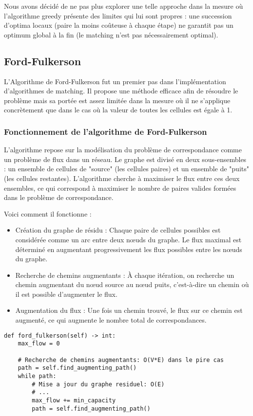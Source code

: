\documentclass[11pt, a4paper]{article}
\begin{document}
Nous avons décidé de ne pas plus explorer une telle approche dans la mesure où l'algorithme greedy présente des limites qui lui sont propres : une succession d'optima locaux (paire la moins coûteuse à chaque étape) ne garantit pas un optimum global à la fin (le matching n'est pas nécessairement optimal).

\subsection{Ford-Fulkerson}

L'Algorithme de Ford-Fulkerson fut un premier pas dans l'implémentation d'algorithmes de matching. Il propose une méthode efficace afin de résoudre le problème mais sa portée est assez limitée dans la mesure où il ne s'applique concrètement que dans le cas où la valeur de toutes les cellules est égale à 1.

\subsubsection{Fonctionnement de l'algorithme de Ford-Fulkerson}

L'algorithme repose sur la modélisation du problème de correspondance comme un problème de flux dans un réseau. Le graphe est divisé en deux sous-ensembles : un ensemble de cellules de "source" (les cellules paires) et un ensemble de "puits" (les cellules restantes). L'algorithme cherche à maximiser le flux entre ces deux ensembles, ce qui correspond à maximiser le nombre de paires valides formées dans le problème de correspondance.

Voici comment il fonctionne :

\begin{itemize}
    \item Création du graphe de résidu : Chaque paire de cellules possibles est considérée comme un arc entre deux nœuds du graphe. Le flux maximal est déterminé en augmentant progressivement les flux possibles entre les nœuds du graphe.
    \item Recherche de chemins augmentants : À chaque itération, on recherche un chemin augmentant du nœud source au nœud puits, c'est-à-dire un chemin où il est possible d'augmenter le flux.
    \item Augmentation du flux : Une fois un chemin trouvé, le flux sur ce chemin est augmenté, ce qui augmente le nombre total de correspondances.
\end{itemize}

\begin{lstlisting}[caption=Implementation de Ford-Fulkerson]
def ford_fulkerson(self) -> int:
    max_flow = 0
    
    # Recherche de chemins augmentants: O(V*E) dans le pire cas
    path = self.find_augmenting_path()
    while path:
        # Mise a jour du graphe residuel: O(E)
        # ...
        max_flow += min_capacity
        path = self.find_augmenting_path()
\end{lstlisting}
\end{document}
